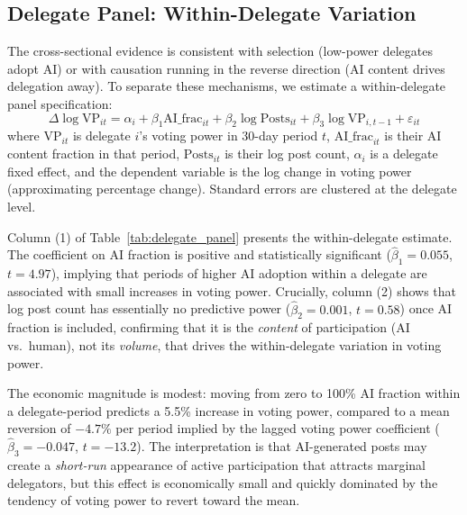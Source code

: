 \documentclass[12pt]{article}
\begin{document}
\subsection{Delegate Panel: Within-Delegate Variation}

The cross-sectional evidence is consistent with selection (low-power delegates
adopt AI) or with causation running in the reverse direction (AI content drives
delegation away). To separate these mechanisms, we estimate a within-delegate
panel specification:
\begin{equation}
  \Delta \log \text{VP}_{it} = \alpha_i + \beta_1 \text{AI\_frac}_{it} +
  \beta_2 \log \text{Posts}_{it} + \beta_3 \log \text{VP}_{i,t-1} + \varepsilon_{it}
  \label{eq:panel}
\end{equation}
where $\text{VP}_{it}$ is delegate $i$'s voting power in 30-day period $t$,
$\text{AI\_frac}_{it}$ is their AI content fraction in that period,
$\text{Posts}_{it}$ is their log post count, $\alpha_i$ is a delegate fixed effect,
and the dependent variable is the log change in voting power (approximating
percentage change). Standard errors are clustered at the delegate level.

Column (1) of Table~\ref{tab:delegate_panel} presents the within-delegate
estimate. The coefficient on AI fraction is positive and statistically significant
($\hat{\beta}_1 = 0.055$, $t = 4.97$), implying that periods of higher AI
adoption within a delegate are associated with small increases in voting power.
Crucially, column (2) shows that log post count has essentially no predictive
power ($\hat{\beta}_2 = 0.001$, $t = 0.58$) once AI fraction is included,
confirming that it is the \emph{content} of participation (AI vs.\ human), not
its \emph{volume}, that drives the within-delegate variation in voting power.

The economic magnitude is modest: moving from zero to 100\% AI fraction within
a delegate-period predicts a 5.5\% increase in voting power, compared to a mean
reversion of $-4.7\%$ per period implied by the lagged voting power coefficient
($\hat{\beta}_3 = -0.047$, $t = -13.2$). The interpretation is that AI-generated
posts may create a \emph{short-run} appearance of active participation that attracts
marginal delegators, but this effect is economically small and quickly dominated
by the tendency of voting power to revert toward the mean.
\end{document}
